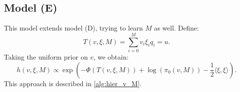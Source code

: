 \documentclass{siamart1116}
\begin{document}
    \subsection{Model (E)} \label{sec:algorithms_model_e}
        This model extends model (D), trying to learn $M$ as well. Define:
        \begin{equation}
        T(v,\xi,M) = \sum_{i=0}^{M} v_i\xi_iq_i = u.
        \end{equation}
        Taking the uniform prior on $v$, we obtain:
        \begin{equation}
        \label{eqn:learn_v_M_posterior}
        h(v, \xi, M) \propto \exp \left(-\Phi(T(v,\xi, M)) + \log (\pi_0(v, M)) - \frac{1}{2}\langle \xi, \xi \rangle  \right).
        \end{equation}
        This approach is described in \cref{alg:hier_v_M}.
\end{document}
